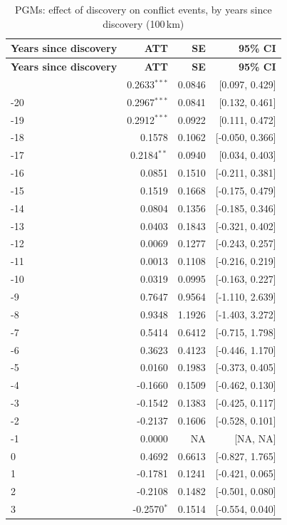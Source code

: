 \begin{longtable}{lrrr}
\caption{PGMs: effect of discovery on conflict events, by years since discovery (100\,km)} \label{tab:pgms_all_conflict_events} \\
\toprule
\textbf{Years since discovery} & \textbf{ATT} & \textbf{SE} & \textbf{95\% CI} \\
\midrule \endfirsthead
\toprule
\textbf{Years since discovery} & \textbf{ATT} & \textbf{SE} & \textbf{95\% CI} \\
\midrule \endhead
\bottomrule \endlastfoot
-21 & 0.2633$^{***}$ & 0.0846 & [0.097, 0.429] \\
-20 & 0.2967$^{***}$ & 0.0841 & [0.132, 0.461] \\
-19 & 0.2912$^{***}$ & 0.0922 & [0.111, 0.472] \\
-18 & 0.1578 & 0.1062 & [-0.050, 0.366] \\
-17 & 0.2184$^{**}$ & 0.0940 & [0.034, 0.403] \\
-16 & 0.0851 & 0.1510 & [-0.211, 0.381] \\
-15 & 0.1519 & 0.1668 & [-0.175, 0.479] \\
-14 & 0.0804 & 0.1356 & [-0.185, 0.346] \\
-13 & 0.0403 & 0.1843 & [-0.321, 0.402] \\
-12 & 0.0069 & 0.1277 & [-0.243, 0.257] \\
-11 & 0.0013 & 0.1108 & [-0.216, 0.219] \\
-10 & 0.0319 & 0.0995 & [-0.163, 0.227] \\
-9 & 0.7647 & 0.9564 & [-1.110, 2.639] \\
-8 & 0.9348 & 1.1926 & [-1.403, 3.272] \\
-7 & 0.5414 & 0.6412 & [-0.715, 1.798] \\
-6 & 0.3623 & 0.4123 & [-0.446, 1.170] \\
-5 & 0.0160 & 0.1983 & [-0.373, 0.405] \\
-4 & -0.1660 & 0.1509 & [-0.462, 0.130] \\
-3 & -0.1542 & 0.1383 & [-0.425, 0.117] \\
-2 & -0.2137 & 0.1606 & [-0.528, 0.101] \\
-1 & 0.0000 & NA & [NA, NA] \\
0 & 0.4692 & 0.6613 & [-0.827, 1.765] \\
1 & -0.1781 & 0.1241 & [-0.421, 0.065] \\
2 & -0.2108 & 0.1482 & [-0.501, 0.080] \\
3 & -0.2570$^{*}$ & 0.1514 & [-0.554, 0.040] \\

\end{longtable}
